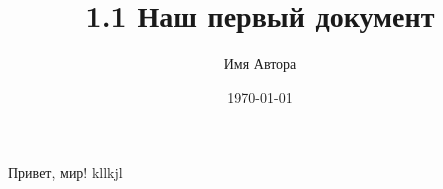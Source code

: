 \documentclass[a4paper,12pt]{article}
\author{Имя Автора}
\title{1.1 Наш первый документ}
\date{\today}
\begin{document}

\maketitle

Привет, мир!
kllkjl
\end{document}
